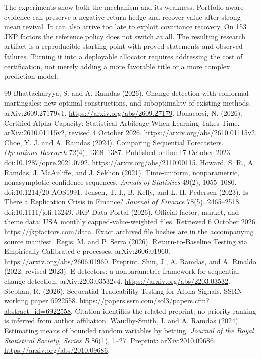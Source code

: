 The experiments show both the mechanism and its weakness. Portfolio-aware evidence can preserve a negative-return hedge and recover value after strong mean revival. It can also arrive too late to exploit covariance recovery. On 153 JKP factors the reference policy does not switch at all. The resulting research artifact is a reproducible starting point with proved statements and observed failures. Turning it into a deployable allocator requires addressing the cost of certification, not merely adding a more favorable title or a more complex prediction model.

\bigskip
\begin{thebibliography}{99}\small
{} Bhattacharyya, S. and A. Ramdas (2026). Change detection with conformal martingales: new optimal constructions, and suboptimality of existing methods. arXiv:2609.27179v1. \url{https://arxiv.org/abs/2609.27179}.
 Bonacorsi, N. (2026). Certified Alpha Capacity: Statistical Arbitrage When Learning Takes Time. arXiv:2610.01115v2, revised 4 October 2026. \url{https://arxiv.org/abs/2610.01115v2}.
 Choe, Y. J. and A. Ramdas (2024). Comparing Sequential Forecasters. \emph{Operations Research} 72(4), 1368--1387. Published online 17 October 2023. doi:10.1287/opre.2021.0792. \url{https://arxiv.org/abs/2110.00115}.
 Howard, S. R., A. Ramdas, J. McAuliffe, and J. Sekhon (2021). Time-uniform, nonparametric, nonasymptotic confidence sequences. \emph{Annals of Statistics} 49(2), 1055--1080. doi:10.1214/20-AOS1991.
 Jensen, T. I., B. Kelly, and L. H. Pedersen (2023). Is There a Replication Crisis in Finance? \emph{Journal of Finance} 78(5), 2465--2518. doi:10.1111/jofi.13249.
 JKP Data Portal (2026). Official factor, market, and theme data; USA monthly capped-value-weighted files. Retrieved 6 October 2026. \url{https://jkpfactors.com/data}. Exact archived file hashes are in the accompanying source manifest.
 Regis, M. and P. Serra (2026). Return-to-Baseline Testing via Empirically Calibrated e-processes. arXiv:2606.01960. \url{https://arxiv.org/abs/2606.01960}. Preprint.
 Shin, J., A. Ramdas, and A. Rinaldo (2022; revised 2023). E-detectors: a nonparametric framework for sequential change detection. arXiv:2203.03532v4. \url{https://arxiv.org/abs/2203.03532}.
 Stephan, R. (2026). Sequential Tradeability Testing for Alpha Signals. SSRN working paper 6922558. \url{https://papers.ssrn.com/sol3/papers.cfm?abstract_id=6922558}. Citation identifies the related preprint; no priority ranking is inferred from author affiliation.
 Waudby-Smith, I. and A. Ramdas (2024). Estimating means of bounded random variables by betting. \emph{Journal of the Royal Statistical Society, Series B} 86(1), 1--27. Preprint: arXiv:2010.09686. \url{https://arxiv.org/abs/2010.09686}.
\end{thebibliography}
